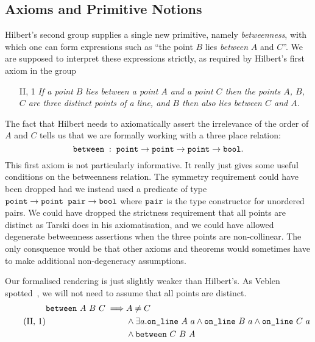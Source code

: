 \subsection{Axioms and Primitive Notions}
Hilbert's second group supplies a single new primitive, namely \emph{betweenness}, with which one can form expressions such as ``the point $B$ lies \emph{between} $A$ and $C$''. We are supposed to interpret these expressions strictly, as required by Hilbert's first axiom in the group
\begin{enumerate}
\item[II, 1] \emph{If a point $B$ lies between a point $A$ and a point $C$ then the points $A$, $B$, $C$ are three distinct points of a line, and $B$ then also lies between $C$ and $A$.}
\end{enumerate}
The fact that Hilbert needs to axiomatically assert the irrelevance of the order of $A$ and $C$ tells us that we are formally working with a three place relation:
\begin{displaymath}
\texttt{between}\;:\;\texttt{point}\rightarrow\texttt{point}\rightarrow\texttt{point}\rightarrow\texttt{bool}.
\end{displaymath}
This first axiom is not particularly informative. It really just gives some useful conditions on the betweenness relation. The symmetry requirement could have been dropped had we instead used a predicate of type $\texttt{point}\rightarrow \texttt{point pair} \rightarrow \texttt{bool}$ where $\texttt{pair}$ is the type constructor for unordered pairs. We could have dropped the strictness requirement that all points are distinct as Tarski does in his axiomatisation, and we could have allowed degenerate betweenness assertions when the three points are non-collinear. The only consquence would be that other axioms and theorems would sometimes have to make additional non-degeneracy assumptions.

Our formalised rendering is just slightly weaker than Hilbert's. As Veblen spotted~\cite{Veblenphd}, we will not need to assume that all points are distinct. 
\begin{equation}\label{eq:g21} 
 \tag{II,~1}
  \begin{split}
    \between{A}{B}{C} \implies & A \neq C\\
                               & \wedge \exists a. \code{on\_line}\ A\ a \wedge \code{on\_line}\ B\ a \wedge \code{on\_line}\ C\ a\\
                               & \wedge \between{C}{B}{A}
  \end{split}
\end{equation}

